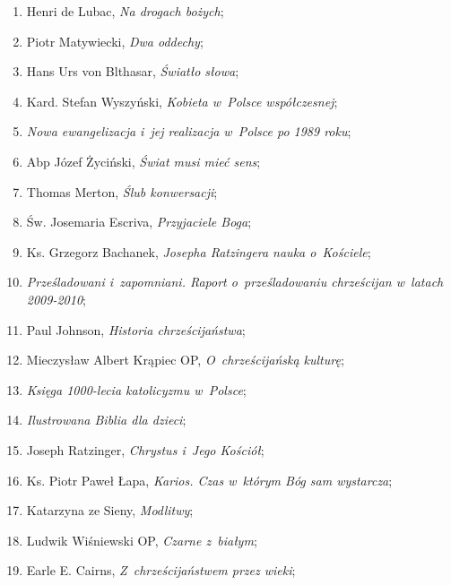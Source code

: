\documentclass[a4paper,11pt]{article}
\begin{document}
\begin{enumerate}
\item Henri de Lubac, \textit{Na drogach bożych};

\item Piotr Matywiecki, \textit{Dwa oddechy};

\item Hans Urs von Blthasar, \textit{Światło słowa};

\item Kard. Stefan Wyszyński, \textit{Kobieta w~Polsce współczesnej};

\item \textit{Nowa ewangelizacja i~jej realizacja w~Polsce po 1989 roku};

\item Abp Józef Życiński, \textit{Świat musi mieć sens};

\item Thomas Merton, \textit{Ślub konwersacji};

\item Św. Josemaria Escriva, \textit{Przyjaciele Boga};

\item Ks. Grzegorz Bachanek, \textit{Josepha Ratzingera nauka o~Kościele};

\item \textit{Prześladowani i~zapomniani. Raport o~prześladowaniu
    chrześcijan w~latach 2009-2010};

\item Paul Johnson, \textit{Historia chrześcijaństwa};

\item Mieczysław Albert Krąpiec OP, \textit{O~chrześcijańską kulturę};

\item \textit{Księga 1000-lecia katolicyzmu w~Polsce};

\item \textit{Ilustrowana Biblia dla dzieci};

\item Joseph Ratzinger, \textit{Chrystus i~Jego Kościół};

\item Ks. Piotr Paweł Łapa, \textit{Karios. Czas w~którym Bóg sam
    wystarcza};

\item Katarzyna ze Sieny, \textit{Modlitwy};

\item Ludwik Wiśniewski OP, \textit{Czarne z~białym};

\item Earle E. Cairns, \textit{Z~chrześcijaństwem przez wieki};


\end{enumerate}
\end{document}
